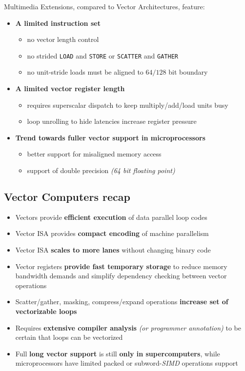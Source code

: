 \documentclass[english]{article}
\begin{document}
Multimedia Extensions, compared to Vector Architectures, feature:

\begin{itemize}
  \item \textbf{A limited instruction set}
        \begin{itemize}
          \item no vector length control
          \item no strided \texttt{LOAD} and \texttt{STORE} or \texttt{SCATTER} and \texttt{GATHER}
          \item no unit-stride loads must be aligned to \(64/128\) bit boundary
        \end{itemize}
  \item \textbf{A limited vector register length}
        \begin{itemize}
          \item requires superscalar dispatch to keep multiply/add/load units busy
          \item loop unrolling to hide latencies increase register pressure
        \end{itemize}
  \item \textbf{Trend towards fuller vector support in microprocessors}
        \begin{itemize}
          \item better support for misaligned memory access
          \item support of double precision \textit{(64 bit floating point)}
        \end{itemize}
\end{itemize}

\subsection{Vector Computers recap}

\begin{itemize}
  \item Vectors provide \textbf{efficient execution} of data parallel loop codes
  \item Vector ISA provides \textbf{compact encoding} of machine parallelism
  \item Vector ISA \textbf{scales to more lanes} without changing binary code
  \item Vector registers \textbf{provide fast temporary storage} to reduce memory bandwidth demands and simplify dependency checking between vector operations
  \item Scatter/gather, masking, compress/expand operations \textbf{increase set of vectorizable loops}
  \item Requires \textbf{extensive compiler analysis} \textit{(or programmer annotation)} to be certain that loops can be vectorized
  \item Full \textbf{long vector support} is still \textbf{only in supercomputers}, while microprocessors have limited packed or subword-\textit{SIMD} operations support
\end{itemize}
\end{document}
